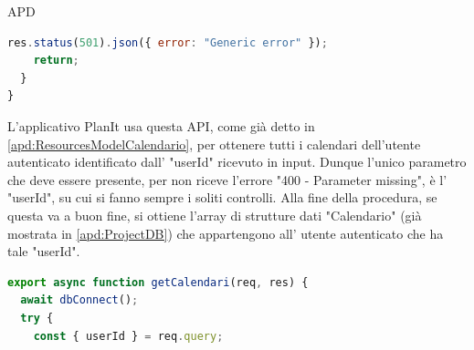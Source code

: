 \begin{listaPersonale} {APD}
\begin{listaPersonale2}[APD]{}
\begin{lstlisting}[language=JavaScript]
    res.status(501).json({ error: "Generic error" });
    return;
  }
}
                \end{lstlisting}
                L'applicativo PlanIt usa questa API, come già detto in \ref{apd:ResourcesModelCalendario}, per ottenere tutti i calendari dell'utente autenticato identificato dall' "userId" ricevuto in input. Dunque l'unico parametro che deve essere presente, per non riceve l'errore "400 - Parameter missing", è l' "userId", su cui si fanno sempre i soliti controlli. Alla fine della procedura, se questa va a buon fine, si ottiene l'array di strutture dati "Calendario" (già mostrata in \ref{apd:ProjectDB}) che appartengono all' utente autenticato che ha tale "userId".

                \begin{lstlisting}[language=JavaScript]
export async function getCalendari(req, res) {
  await dbConnect();
  try {
    const { userId } = req.query;


\end{lstlisting}
\end{listaPersonale2}
\end{listaPersonale}
